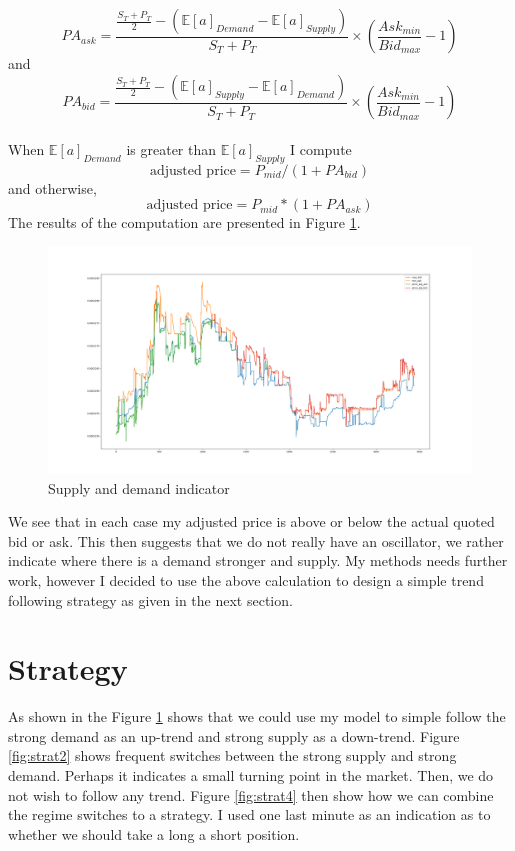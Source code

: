 \documentclass[12pt]{article}
\begin{document}
\[
	PA_{ask} = \frac{\frac{S_T + P_T}{2} - (\mathbb{E}[a]_{Demand} - \mathbb{E}[a]_{Supply})}{S_T + P_T} \times \left(\frac{Ask_{min}}{Bid_{max}} - 1 \right)
\]
and
\[
	PA_{bid} = \frac{\frac{S_T + P_T}{2} - (\mathbb{E}[a]_{Supply} -\mathbb{E}[a]_{Demand} )}{S_T + P_T} \times \left(\frac{Ask_{min}}{Bid_{max}} - 1 \right)
\]
\\
When $\mathbb{E}[a]_{Demand}$ is greater than $\mathbb{E}[a]_{Supply}$ I compute 
\[
  \text{adjusted price} = P_{mid} / (1 + PA_{bid})
\]
and otherwise,
\[
  \text{adjusted price} = P_{mid} * (1 + PA_{ask})
\]
The results of the computation are presented in Figure \ref{fig:strat1}.
\begin{figure}[h!]
	\centering
  \includegraphics[width=\textwidth]{strategy1.png}
  \caption{Supply and demand indicator}
  \label{fig:strat1}
\end{figure}
We see that in each case my adjusted price is above or below the actual quoted bid or ask. This then suggests that we do not really have an oscillator, we rather indicate where there is a demand stronger and supply. My methods needs further work, however I decided to use the above calculation to design a simple trend following strategy as given in the next section.

\section*{Strategy}
As shown in the Figure \ref{fig:strat1} shows that we could use my model to simple follow the strong demand as an up-trend and strong supply as a down-trend. Figure \ref{fig:strat2} shows frequent switches between the strong supply and strong demand. Perhaps it indicates a small turning point in the market. Then, we do not wish to follow any trend.
Figure \ref{fig:strat4} then show how we can combine the regime switches to a strategy. I used one last minute as an indication as to whether we should take a long a short position.
\end{document}
